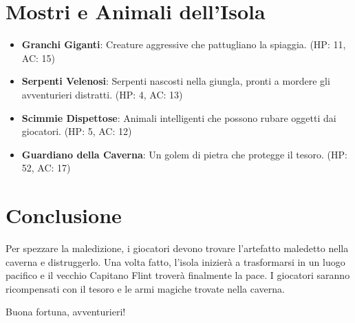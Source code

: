 \documentclass{article}
\begin{document}
\section*{Mostri e Animali dell'Isola}

\begin{itemize}
    \item \textbf{Granchi Giganti}: Creature aggressive che pattugliano la spiaggia. (HP: 11, AC: 15)
    \item \textbf{Serpenti Velenosi}: Serpenti nascosti nella giungla, pronti a mordere gli avventurieri distratti. (HP: 4, AC: 13)
    \item \textbf{Scimmie Dispettose}: Animali intelligenti che possono rubare oggetti dai giocatori. (HP: 5, AC: 12)
    \item \textbf{Guardiano della Caverna}: Un golem di pietra che protegge il tesoro. (HP: 52, AC: 17)
\end{itemize}

\section*{Conclusione}

Per spezzare la maledizione, i giocatori devono trovare l'artefatto maledetto nella caverna e distruggerlo. Una volta fatto, l'isola inizierà a trasformarsi in un luogo pacifico e il vecchio Capitano Flint troverà finalmente la pace. I giocatori saranno ricompensati con il tesoro e le armi magiche trovate nella caverna.

Buona fortuna, avventurieri!
\end{document}
